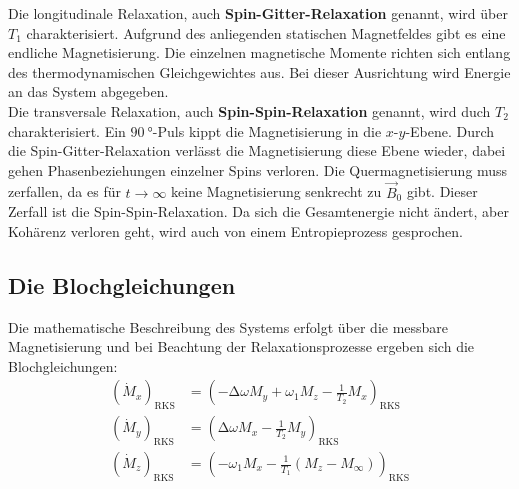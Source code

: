         \noindent Die longitudinale Relaxation, auch \textbf{Spin-Gitter-Relaxation} genannt, wird über $T_1$ charakterisiert. Aufgrund des anliegenden statischen Magnetfeldes gibt es eine 
        endliche Magnetisierung. Die einzelnen magnetische Momente richten sich entlang des thermodynamischen Gleichgewichtes aus. Bei dieser Ausrichtung wird Energie an das System abgegeben. \\

        \noindent Die transversale Relaxation, auch \textbf{Spin-Spin-Relaxation} genannt, wird duch $T_2$ charakterisiert. Ein $\SI{90}{\degree}$-Puls kippt die Magnetisierung in die $x$-$y$-Ebene. 
        Durch die Spin-Gitter-Relaxation verlässt die Magnetisierung diese Ebene wieder, dabei gehen Phasenbeziehungen einzelner Spins verloren. Die Quermagnetisierung muss zerfallen, da es für $t \to \infty$ 
        keine Magnetisierung senkrecht zu $\vec{B}_0$ gibt. Dieser Zerfall ist die Spin-Spin-Relaxation. Da sich die Gesamtenergie nicht ändert, aber Kohärenz verloren geht, wird auch von einem Entropieprozess 
        gesprochen. 

    \subsection{Die Blochgleichungen}

        \noindent Die mathematische Beschreibung des Systems erfolgt über die messbare Magnetisierung und bei Beachtung der Relaxationsprozesse ergeben sich die Blochgleichungen: 
        \begin{align*}
            \left(\dot{M}_x\right)_{\text{RKS}} & = \left(- \increment \omega M_y + \omega_1M_z - \frac{1}{T_2} M_x\right)_{\text{RKS}} \\
            \left(\dot{M}_y\right)_{\text{RKS}} & = \left(\increment \omega M_x - \frac{1}{T_2} M_y\right)_{\text{RKS}} \\
            \left(\dot{M}_z\right)_{\text{RKS}} & = \left( - \omega_1 M_x - \frac{1}{T_1}(M_z - M_\infty)\right)_{\text{RKS}} 
        \end{align*} 
